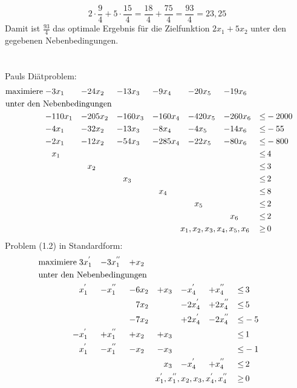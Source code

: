 \documentclass[10pt,a4paper,oneside,ngerman,numbers=noenddot]{scrartcl}
\begin{document}
	\[
		2 \cdot \frac{9}{4} + 5 \cdot \frac{15}{4} = \frac{18}{4} + \frac{75}{4} = \frac{93}{4} = 23,25
	\]
	Damit ist $\frac{93}{4}$ das optimale Ergebnis für die Zielfunktion $2x_{1} + 5x_{2}$ unter den gegebenen Nebenbedingungen.
\section{} %
	\subsection{} %
	Pauls Diätproblem:\\
	\begin{alignat*}{7}
		\text{maximiere}\; -& 3x_{1} &-& 24x_{2} &-& 13x_{3} &-& 9x_{4} &-& 20x_{5} &-& 19x_{6} && \\
		\multicolumn{14}{l}{\text{unter den Nebenbedingungen}} && \\
		- & 110x_{1} &-& 205x_{2} &-& 160x_{3} &-& 160x_{4} &-& 420x_{5} &-& 260x_{6} &\leq & -2000 \\
		-& 4x_{1} &-& 32x_{2} &-& 13x_{3} &-& 8x_{4} &-& 4x_{5} &-& 14x_{6} &\leq & -55 \\
		-& 2x_{1} &-& 12x_{2} &-& 54x_{3} &-& 285x_{4} &-& 22x_{5} &-& 80x_{6} &\leq & -800 \\
		& x_{1} && && && && && &\leq &\, 4 \\
		& && x_{2} && && && && &\leq &\, 3 \\
		& && && x_{3} && && && &\leq &\, 2 \\
		& && && && x_{4} && && &\leq &\, 8 \\
		& && && && && x_{5} && &\leq &\, 2 \\
		& && && && && && x_{6} &\leq &\, 2 \\
		\multicolumn{12}{r}{$x_{1}, x_{2}, x_{3}, x_{4}, x_{5}, x_{6}$} \,&\geq &\, 0
		\end{alignat*}
		Problem (1.2) in Standardform:\\
		\begin{alignat*}{7}
		\text{maximiere}\; & 3x_{1}^{'} &-& 3x_{1}^{''} &+& x_{2} && && && \\
		\multicolumn{14}{l}{\text{unter den Nebenbedingungen}} && \\
		& x_{1}^{'} &-& x_{1}^{''} &-& 6x_{2} &+& x_{3} &-& x_{4}^{'} &+& x_{4}^{''} &\leq &\, 3 \\
		& && && 7x_{2} && &-& 2x_{4}^{'} &+& 2x_{4}^{''} &\leq &\, 5 \\
		& && &-& 7x_{2} && &+& 2x_{4}^{'} &-& 2x_{4}^{''} &\leq & -5 \\
		-& x_{1}^{'} &+& x_{1}^{''} &+& x_{2} &+& x_{3} && && &\leq &\, 1 \\
		& x_{1}^{'} &-& x_{1}^{''} &-& x_{2} &-& x_{3} && && &\leq & -1 \\
		& && && && x_{3} &-& x_{4}^{'} &+& x_{4}^{''} &\leq &\, 2 \\
		\multicolumn{12}{r}{$x_{1}^{'}, x_{1}^{''}, x_{2}, x_{3}, x_{4}^{'}, x_{4}^{''}$} \,&\geq &\, 0
		\end{alignat*}
\end{document}
